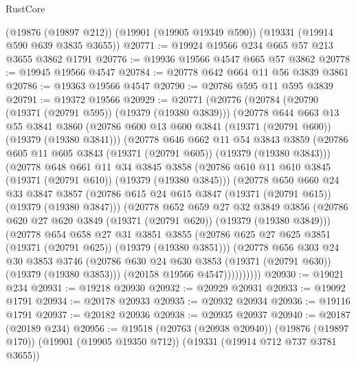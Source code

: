 \begin{lexlean}{RustCore}
\begin{coremodule}
    (@19876 (@19897 @212))
    (@19901 (@19905 @19349 @590))
    (@19331 (@19914 @590 @639 @3835 @3655))
@20771 := @19924 @19566 @234 @665 @57 @213 @3655 @3862 @1791
@20776 := @19936 @19566 @4547 @665 @57 @3862
@20778 := @19945 @19566 @4547
@20784 := @20778 @642 @664 @11 @56 @3839 @3861
@20786 := @19363 @19566 @4547
@20790 := @20786 @595 @11 @595 @3839
@20791 := @19372 @19566
@20929 := @20771
    (@20776
      (@20784
        (@20790 (@19371 (@20791 @595)) (@19379 (@19380 @3839)))
        (@20778
          @644
          @663
          @13
          @55
          @3841
          @3860
          (@20786 @600 @13 @600 @3841 (@19371 (@20791 @600)) (@19379 (@19380 @3841)))
          (@20778
            @646
            @662
            @11
            @54
            @3843
            @3859
            (@20786 @605 @11 @605 @3843 (@19371 (@20791 @605)) (@19379 (@19380 @3843)))
            (@20778
              @648
              @661
              @11
              @34
              @3845
              @3858
              (@20786 @610 @11 @610 @3845 (@19371 (@20791 @610)) (@19379 (@19380 @3845)))
              (@20778
                @650
                @660
                @24
                @33
                @3847
                @3857
                (@20786 @615 @24 @615 @3847 (@19371 (@20791 @615)) (@19379 (@19380 @3847)))
                (@20778
                  @652
                  @659
                  @27
                  @32
                  @3849
                  @3856
                  (@20786 @620 @27 @620 @3849 (@19371 (@20791 @620)) (@19379 (@19380 @3849)))
                  (@20778
                    @654
                    @658
                    @27
                    @31
                    @3851
                    @3855
                    (@20786 @625 @27 @625 @3851 (@19371 (@20791 @625)) (@19379 (@19380 @3851)))
                    (@20778
                      @656
                      @303
                      @24
                      @30
                      @3853
                      @3746
                      (@20786 @630 @24 @630 @3853 (@19371 (@20791 @630)) (@19379 (@19380 @3853)))
                      (@20158 @19566 @4547))))))))))
@20930 := @19021 @234
@20931 := @19218 @20930
@20932 := @20929 @20931
@20933 := @19092 @1791
@20934 := @20178 @20933
@20935 := @20932 @20934
@20936 := @19116 @1791
@20937 := @20182 @20936
@20938 := @20935 @20937
@20940 := @20187 (@20189 @234)
@20956 := @19518
    (@20763 (@20938 @20940))
    (@19876 (@19897 @170))
    (@19901 (@19905 @19350 @712))
    (@19331 (@19914 @712 @737 @3781 @3655))

\end{coremodule}
\end{lexlean}
